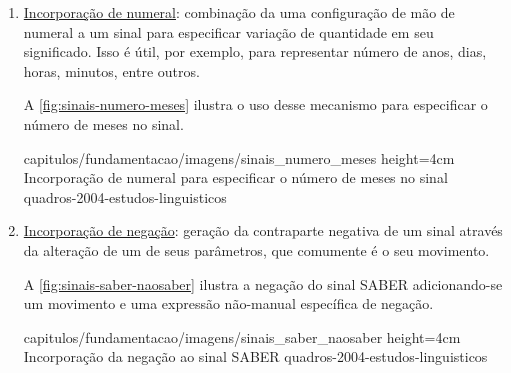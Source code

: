 \begin{enumerate}
\begin{enumerate}
              \item \underline{Incorporação de numeral}: combinação da uma configuração de mão de numeral a um sinal para especificar variação de quantidade em seu significado. Isso é útil, por exemplo, para representar número de anos, dias, horas, minutos, entre outros.

                    A \autoref{fig:sinais-numero-meses} ilustra o uso desse mecanismo para especificar o número de meses no sinal.


                    {capitulos/fundamentacao/imagens/sinais_numero_meses} %
                    {height=4cm} %
                    {Incorporação de numeral para especificar o número de meses no sinal} %
                    {quadros-2004-estudos-linguisticos} %



              \item \underline{Incorporação de negação}: geração da contraparte negativa de um sinal através da alteração de um de seus parâmetros, que comumente é o seu movimento.

                    A \autoref{fig:sinais-saber-naosaber} ilustra a negação do sinal SABER adicionando-se um movimento e uma expressão não-manual específica de negação.


                    {capitulos/fundamentacao/imagens/sinais_saber_naosaber} %
                    {height=4cm} %
                    {Incorporação da negação ao sinal SABER} %
                    {quadros-2004-estudos-linguisticos} %



\end{enumerate}
\end{enumerate}
